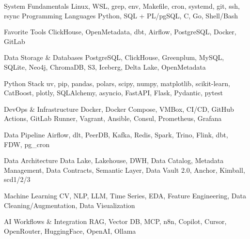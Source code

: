 


\begin{cvskills}

  \cvskill
    {System Fundamentals} %
    {Linux, WSL, grep, env, Makefile, cron, systemd, git, ssh, rsync} %
  \cvskill
    {Programming Languages} %
    {Python, SQL + PL/pgSQL, C, Go, Shell/Bash} %

  \cvskill
    {Favorite Tools} %
    {ClickHouse, OpenMetadata, dbt, Airflow, PostgreSQL, Docker, GitLab} %

  \cvskill
    {Data Storage \& Databases} %
    {PostgreSQL, ClickHouse, Greenplum, MySQL, SQLite, Neo4j, ChromaDB, S3, Iceberg, Delta Lake, OpenMetadata} %

  \cvskill
    {Python Stack} %
    {uv, pip, pandas, polars, scipy, numpy, matplotlib, scikit-learn, CatBoost, plotly, SQLAlchemy, asyncio, FastAPI, Flask, Pydantic, pytest} %

  \cvskill
    {DevOps \& Infrastructure} %
    {Docker, Docker Compose, VMBox, CI/CD, GitHub Actions, GitLab Runner, Vagrant, Ansible, Consul, Prometheus, Grafana} %

  \cvskill
    {Data Pipeline} %
    {Airflow, dlt, PeerDB, Kafka, Redis, Spark, Trino, Flink, dbt, FDW, pg\_cron} %

  \cvskill
    {Data Architecture} %
    {Data Lake, Lakehouse, DWH, Data Catalog, Metadata Management, Data Contracts, Semantic Layer, Data Vault 2.0, Anchor, Kimball, scd1/2/3} %

  \cvskill
    {Machine Learning} %
    {CV, NLP, LLM, Time Series, EDA, Feature Engineering, Data Cleaning/Augmentation, Data Visualization} %

  \cvskill
    {AI Workflows \& Integration} %
    {RAG, Vector DB, MCP, n8n, Copilot, Cursor, OpenRouter, HuggingFace, OpenAI, Ollama} %

\end{cvskills}


